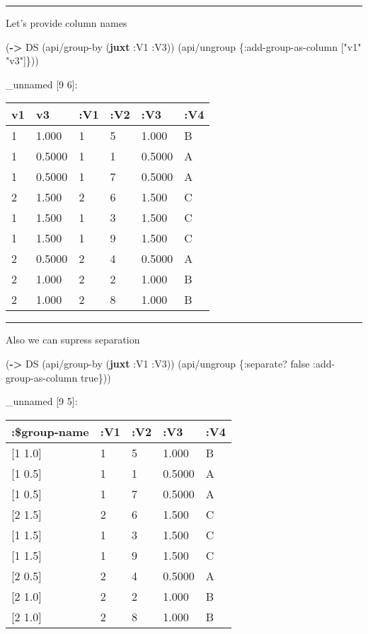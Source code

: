 \documentclass[]{article}
\newenvironment{Shaded}{\begin{snugshade}}{\end{snugshade}}
\newcommand{\KeywordTok}[1]{\textcolor[rgb]{0.13,0.29,0.53}{\textbf{#1}}}
\newcommand{\StringTok}[1]{\textcolor[rgb]{0.31,0.60,0.02}{#1}}
\newcommand{\VariableTok}[1]{\textcolor[rgb]{0.00,0.00,0.00}{#1}}
\newcommand{\AttributeTok}[1]{\textcolor[rgb]{0.77,0.63,0.00}{#1}}
\newcommand{\NormalTok}[1]{#1}
\begin{document}
\begin{center}\rule{0.5\linewidth}{0.5pt}\end{center}

Let's provide column names

\begin{Shaded}
\begin{Highlighting}[]
\NormalTok{(}\KeywordTok{->}\NormalTok{ DS}
\NormalTok{    (api/group-by (}\KeywordTok{juxt} \AttributeTok{:V1} \AttributeTok{:V3}\NormalTok{))}
\NormalTok{    (api/ungroup \{}\AttributeTok{:add-group-as-column}\NormalTok{ [}\StringTok{"v1"} \StringTok{"v3"}\NormalTok{]\}))}
\end{Highlighting}
\end{Shaded}

\_unnamed {[}9 6{]}:

\begin{longtable}[]{@{}llllll@{}}
\toprule
v1 & v3 & :V1 & :V2 & :V3 & :V4\tabularnewline
\midrule
\endhead
1 & 1.000 & 1 & 5 & 1.000 & B\tabularnewline
1 & 0.5000 & 1 & 1 & 0.5000 & A\tabularnewline
1 & 0.5000 & 1 & 7 & 0.5000 & A\tabularnewline
2 & 1.500 & 2 & 6 & 1.500 & C\tabularnewline
1 & 1.500 & 1 & 3 & 1.500 & C\tabularnewline
1 & 1.500 & 1 & 9 & 1.500 & C\tabularnewline
2 & 0.5000 & 2 & 4 & 0.5000 & A\tabularnewline
2 & 1.000 & 2 & 2 & 1.000 & B\tabularnewline
2 & 1.000 & 2 & 8 & 1.000 & B\tabularnewline
\bottomrule
\end{longtable}

\begin{center}\rule{0.5\linewidth}{0.5pt}\end{center}

Also we can supress separation

\begin{Shaded}
\begin{Highlighting}[]
\NormalTok{(}\KeywordTok{->}\NormalTok{ DS}
\NormalTok{    (api/group-by (}\KeywordTok{juxt} \AttributeTok{:V1} \AttributeTok{:V3}\NormalTok{))}
\NormalTok{    (api/ungroup \{}\AttributeTok{:separate}\NormalTok{? }\VariableTok{false}
                  \AttributeTok{:add-group-as-column} \VariableTok{true}\NormalTok{\}))}
\end{Highlighting}
\end{Shaded}

\_unnamed {[}9 5{]}:

\begin{longtable}[]{@{}lllll@{}}
\toprule
:\$group-name & :V1 & :V2 & :V3 & :V4\tabularnewline
\midrule
\endhead
{[}1 1.0{]} & 1 & 5 & 1.000 & B\tabularnewline
{[}1 0.5{]} & 1 & 1 & 0.5000 & A\tabularnewline
{[}1 0.5{]} & 1 & 7 & 0.5000 & A\tabularnewline
{[}2 1.5{]} & 2 & 6 & 1.500 & C\tabularnewline
{[}1 1.5{]} & 1 & 3 & 1.500 & C\tabularnewline
{[}1 1.5{]} & 1 & 9 & 1.500 & C\tabularnewline
{[}2 0.5{]} & 2 & 4 & 0.5000 & A\tabularnewline
{[}2 1.0{]} & 2 & 2 & 1.000 & B\tabularnewline
{[}2 1.0{]} & 2 & 8 & 1.000 & B\tabularnewline
\bottomrule
\end{longtable}
\end{document}
